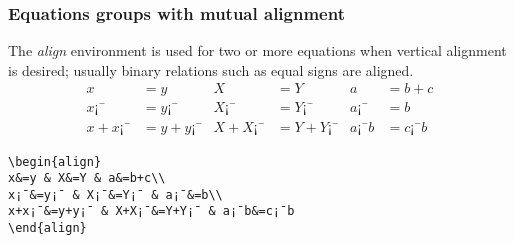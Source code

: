 \documentclass[12pt]{beamer}
\begin{document}
\begin{frame}[fragile]
  \frametitle{Equations groups with mutual alignment}
  The \emph{align} environment is used for two or more equations when vertical alignment is desired; usually binary relations such as equal signs are aligned.\\
  \begin{align}
x&=y & X&=Y & a&=b+c\\
x¡¯&=y¡¯ & X¡¯&=Y¡¯ & a¡¯&=b\\
x+x¡¯&=y+y¡¯ & X+X¡¯&=Y+Y¡¯ & a¡¯b&=c¡¯b
\end{align}

\begin{verbatim}
\begin{align}
x&=y & X&=Y & a&=b+c\\
x¡¯&=y¡¯ & X¡¯&=Y¡¯ & a¡¯&=b\\
x+x¡¯&=y+y¡¯ & X+X¡¯&=Y+Y¡¯ & a¡¯b&=c¡¯b
\end{align}
\end{verbatim}
\end{frame}
\end{document}
